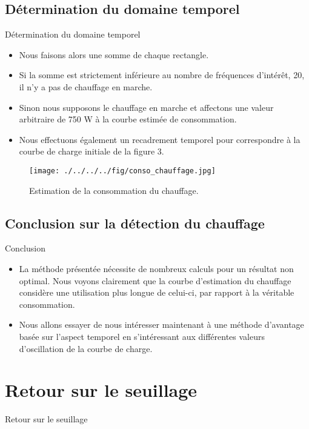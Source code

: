 \documentclass{beamer}
\begin{document}
\subsection{Détermination du domaine temporel}
\begin{frame}{Détermination du domaine temporel}
\begin{itemize}
	\item Nous faisons alors une somme de chaque rectangle.
	\item Si la somme est strictement inférieure au nombre de fréquences d'intérêt, 20, il n'y a pas de chauffage en marche.
	\item Sinon nous supposons le chauffage en marche et affectons une valeur arbitraire de 750 W à la courbe estimée de consommation.
	\item Nous effectuons également un recadrement temporel pour correspondre à la courbe de charge initiale de la figure 3.
\end{itemize}
\end{frame}

\begin{frame}
\begin{figure}[!h]
\begin{center}
\texttt{[image: ./../../../fig/conso\_chauffage.jpg]}
\caption{Estimation de la consommation du chauffage.}
\label{Figure7}
\end{center}
\end{figure}
\end{frame}

\subsection{Conclusion sur la détection du chauffage}
\begin{frame}{Conclusion}
\begin{itemize}
	\item La méthode présentée nécessite de nombreux calculs pour un résultat non optimal. Nous voyons clairement que la courbe d'estimation du chauffage considère une utilisation plus longue de celui-ci, par rapport à la véritable consommation.
	\item Nous allons essayer de nous intéresser maintenant à une méthode d'avantage basée sur l'aspect temporel en s'intéressant aux différentes valeurs d'oscillation de la courbe de charge.
\end{itemize}
\end{frame}

\section{Retour sur le seuillage}
\begin{frame}{Retour sur le seuillage}
\end{frame}
\end{document}
